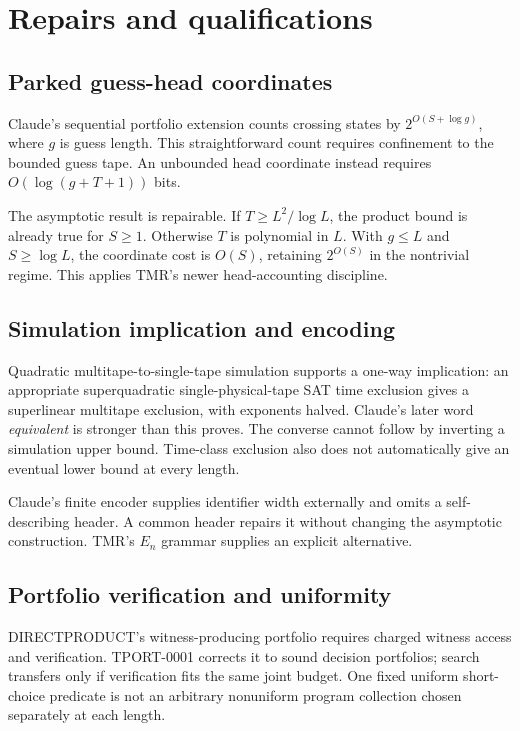 \documentclass[11pt]{article}
\begin{document}
\section{Repairs and qualifications}
\subsection{Parked guess-head coordinates}
Claude's sequential portfolio extension counts crossing states by \(2^{O(S+\log g)}\), where \(g\) is guess length. This straightforward count requires confinement to the bounded guess tape. An unbounded head coordinate instead requires \(O(\log(g+T+1))\) bits.

The asymptotic result is repairable. If \(T\ge L^2/\log L\), the product bound is already true for \(S\ge1\). Otherwise \(T\) is polynomial in \(L\). With \(g\le L\) and \(S\ge\log L\), the coordinate cost is \(O(S)\), retaining \(2^{O(S)}\) in the nontrivial regime. This applies TMR's newer head-accounting discipline.

\subsection{Simulation implication and encoding}
Quadratic multitape-to-single-tape simulation supports a one-way implication: an appropriate superquadratic single-physical-tape SAT time exclusion gives a superlinear multitape exclusion, with exponents halved. Claude's later word \emph{equivalent} is stronger than this proves. The converse cannot follow by inverting a simulation upper bound. Time-class exclusion also does not automatically give an eventual lower bound at every length.

Claude's finite encoder supplies identifier width externally and omits a self-describing header. A common header repairs it without changing the asymptotic construction. TMR's \(E_n\) grammar supplies an explicit alternative.

\subsection{Portfolio verification and uniformity}
DIRECTPRODUCT's witness-producing portfolio requires charged witness access and verification. TPORT-0001 corrects it to sound decision portfolios; search transfers only if verification fits the same joint budget. One fixed uniform short-choice predicate is not an arbitrary nonuniform program collection chosen separately at each length.
\end{document}
